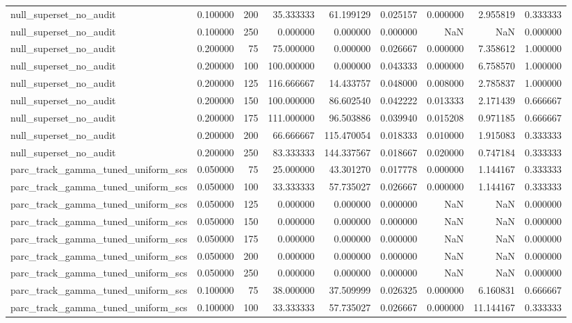 \begin{tabular}{lrrrrrrrr}
null_superset_no_audit & 0.100000 & 200 & 35.333333 & 61.199129 & 0.025157 & 0.000000 & 2.955819 & 0.333333 \\
null_superset_no_audit & 0.100000 & 250 & 0.000000 & 0.000000 & 0.000000 & NaN & NaN & 0.000000 \\
null_superset_no_audit & 0.200000 & 75 & 75.000000 & 0.000000 & 0.026667 & 0.000000 & 7.358612 & 1.000000 \\
null_superset_no_audit & 0.200000 & 100 & 100.000000 & 0.000000 & 0.043333 & 0.000000 & 6.758570 & 1.000000 \\
null_superset_no_audit & 0.200000 & 125 & 116.666667 & 14.433757 & 0.048000 & 0.008000 & 2.785837 & 1.000000 \\
null_superset_no_audit & 0.200000 & 150 & 100.000000 & 86.602540 & 0.042222 & 0.013333 & 2.171439 & 0.666667 \\
null_superset_no_audit & 0.200000 & 175 & 111.000000 & 96.503886 & 0.039940 & 0.015208 & 0.971185 & 0.666667 \\
null_superset_no_audit & 0.200000 & 200 & 66.666667 & 115.470054 & 0.018333 & 0.010000 & 1.915083 & 0.333333 \\
null_superset_no_audit & 0.200000 & 250 & 83.333333 & 144.337567 & 0.018667 & 0.020000 & 0.747184 & 0.333333 \\
parc_track_gamma_tuned_uniform_scs & 0.050000 & 75 & 25.000000 & 43.301270 & 0.017778 & 0.000000 & 1.144167 & 0.333333 \\
parc_track_gamma_tuned_uniform_scs & 0.050000 & 100 & 33.333333 & 57.735027 & 0.026667 & 0.000000 & 1.144167 & 0.333333 \\
parc_track_gamma_tuned_uniform_scs & 0.050000 & 125 & 0.000000 & 0.000000 & 0.000000 & NaN & NaN & 0.000000 \\
parc_track_gamma_tuned_uniform_scs & 0.050000 & 150 & 0.000000 & 0.000000 & 0.000000 & NaN & NaN & 0.000000 \\
parc_track_gamma_tuned_uniform_scs & 0.050000 & 175 & 0.000000 & 0.000000 & 0.000000 & NaN & NaN & 0.000000 \\
parc_track_gamma_tuned_uniform_scs & 0.050000 & 200 & 0.000000 & 0.000000 & 0.000000 & NaN & NaN & 0.000000 \\
parc_track_gamma_tuned_uniform_scs & 0.050000 & 250 & 0.000000 & 0.000000 & 0.000000 & NaN & NaN & 0.000000 \\
parc_track_gamma_tuned_uniform_scs & 0.100000 & 75 & 38.000000 & 37.509999 & 0.026325 & 0.000000 & 6.160831 & 0.666667 \\
parc_track_gamma_tuned_uniform_scs & 0.100000 & 100 & 33.333333 & 57.735027 & 0.026667 & 0.000000 & 11.144167 & 0.333333 \\

\end{tabular}
